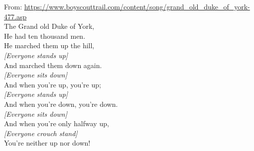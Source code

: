 
From: \url{https://www.boyscouttrail.com/content/song/grand_old_duke_of_york-477.asp}\\

The Grand old Duke of York,\\
He had ten thousand men.\\
He marched them up the hill,\\
\textit{[Everyone stands up]}\\
And marched them down again.\\
\textit{[Everyone sits down]}\\
And when you're up, you're up;\\
\textit{[Everyone stands up]}\\
And when you're down, you're down.\\
\textit{[Everyone sits down]}\\
And when you're only halfway up,\\
\textit{[Everyone crouch stand]}\\
You're neither up nor down!
